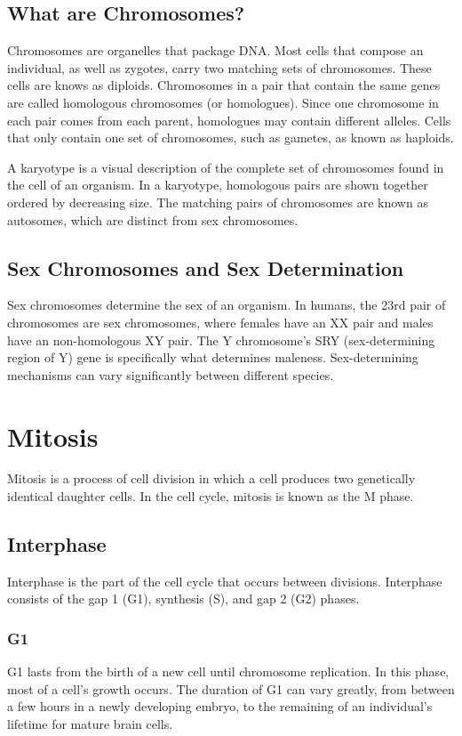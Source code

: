 \documentclass[12pt,titlepage]{article}
\begin{document}
      \subsection{What are Chromosomes?}
        Chromosomes are organelles that package DNA. Most cells that compose an individual, as well as zygotes, carry two matching sets of chromosomes.
        These cells are knows as diploids. Chromosomes in a pair that contain the same genes are called homologous chromosomes (or homologues).
        Since one chromosome in each pair comes from each parent, homologues may contain different alleles. Cells that only contain one set of chromosomes,
        such as gametes, as known as haploids.

        A karyotype is a visual description of the complete set of chromosomes found in the cell of an organism. In a karyotype, homologous pairs are shown
        together ordered by decreasing size. The matching pairs of chromosomes are known as autosomes, which are distinct from sex chromosomes.

      \subsection{Sex Chromosomes and Sex Determination}
        Sex chromosomes determine the sex of an organism. In humans, the 23rd pair of chromosomes are sex chromosomes, where females have an XX pair and males have
        an non-homologous XY pair. The Y chromosome's SRY (sex-determining region of Y) gene is specifically what determines maleness. Sex-determining mechanisms
        can vary significantly between different species.

    \section{Mitosis}
      Mitosis is a process of cell division in which a cell produces two genetically identical daughter cells. In the cell cycle, mitosis is known as the M phase.

      \subsection{Interphase}
        Interphase is the part of the cell cycle that occurs between divisions. Interphase consists of the gap 1 (G1), synthesis (S), and gap 2 (G2) phases.

        \subsubsection{G1}
          G1 lasts from the birth of a new cell until chromosome replication. In this phase, most of a cell's growth occurs. The duration of G1 can vary greatly,
          from between a few hours in a newly developing embryo, to the remaining of an individual's lifetime for mature brain cells.
\end{document}
